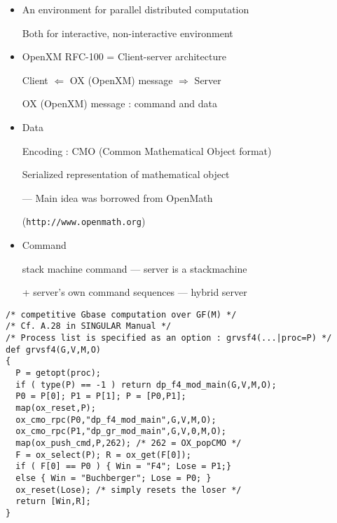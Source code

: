 \documentclass{slides}
\begin{document}
\begin{slide}{}

\begin{itemize}
\item An environment for parallel distributed computation

Both for interactive, non-interactive environment

\item OpenXM RFC-100 = Client-server architecture

Client $\Leftarrow$ OX (OpenXM) message $\Rightarrow$ Server

OX (OpenXM) message : command and data

\item Data

Encoding : CMO (Common Mathematical Object format)

Serialized representation of mathematical object

--- Main idea was borrowed from OpenMath 

({\tt http://www.openmath.org})

\item Command

stack machine command --- server is a stackmachine

+ server's own command sequences --- hybrid server
\end{itemize}
\end{slide}

\begin{slide}{}

\begin{verbatim}
/* competitive Gbase computation over GF(M) */
/* Cf. A.28 in SINGULAR Manual */
/* Process list is specified as an option : grvsf4(...|proc=P) */
def grvsf4(G,V,M,O)
{
  P = getopt(proc);
  if ( type(P) == -1 ) return dp_f4_mod_main(G,V,M,O);
  P0 = P[0]; P1 = P[1]; P = [P0,P1];
  map(ox_reset,P);
  ox_cmo_rpc(P0,"dp_f4_mod_main",G,V,M,O);
  ox_cmo_rpc(P1,"dp_gr_mod_main",G,V,0,M,O);
  map(ox_push_cmd,P,262); /* 262 = OX_popCMO */
  F = ox_select(P); R = ox_get(F[0]);
  if ( F[0] == P0 ) { Win = "F4"; Lose = P1;}
  else { Win = "Buchberger"; Lose = P0; }
  ox_reset(Lose); /* simply resets the loser */
  return [Win,R];
}
\end{verbatim}
\end{slide}
\end{document}
